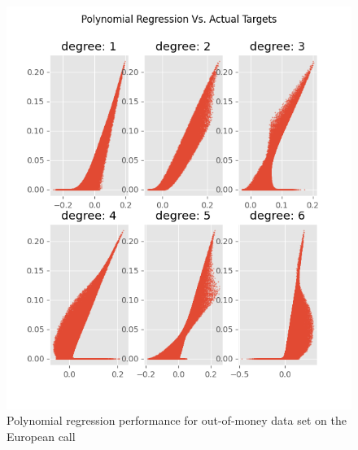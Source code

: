 \begin{figure}[H]
\centering
\includegraphics{Figures/polynomialOutMoneyEuroC.png}
\decoRule
\caption[Polynomial Regression Performance for Out-of-money Data Set European Call]{Polynomial regression performance for out-of-money data set on the European call}
\label{fig:MLPsEuroCOutOfMoney}
\end{figure}

